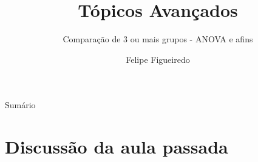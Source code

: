 \documentclass{beamer}
\title%
{Tópicos Avançados}
\subtitle
{Comparação de 3 ou mais grupos - ANOVA e afins} %
\author%
{Felipe Figueiredo}%
\institute[INTO] %
{Instituto Nacional de Traumatologia e Ortopedia
}
\date%
{}
\begin{document}
\begin{frame}
  \titlepage
\end{frame}

\begin{frame}{Sumário}
  \tableofcontents
\end{frame}








\section{Discussão da aula passada}
\end{document}
